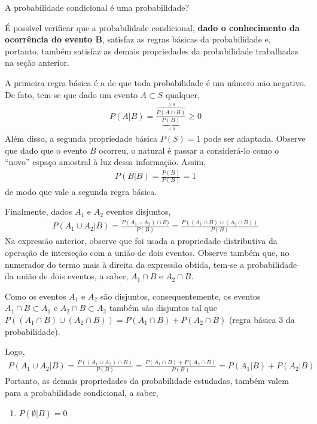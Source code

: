 \begin{example} {A probabilidade condicional é uma probabilidade?}

É possível verificar que a probabilidade condicional, \textbf{dado o conhecimento da ocorrência do evento B}, satisfaz as regras básicas da probabilidade e, portanto, também satisfaz as demais propriedades da probabilidade trabalhadas na seção anterior.

A primeira regra básica é a de que toda probabilidade é um número não negativo. De fato, tem-se que dado um evento \(A\subset S\) qualquer,
\begin{equation*}
\begin{split}P(A|B)=\frac{\overbrace{P(A\cap B)}^{\geq 0}}{\underbrace{P(B)}_{>0}}\geq 0\end{split}
\end{equation*}
Além disso, a segunda propriedade básica \(P(S)=1\) pode ser adaptada.  Observe que dado que o evento \(B\) ocorreu, o natural é passar a considerá-lo como o “novo”{} espaço amostral à luz dessa informação. Assim,
\begin{equation*}
\begin{split}P(B|B)=\frac{P(B)}{P(B)}=1\end{split}
\end{equation*}
de modo que vale a segunda regra básica.

Finalmente, dados \(A_1\) e \(A_2\)  eventos disjuntos,
\begin{equation*}
\begin{split}P(A_1\cup A_2|B)=\frac{P(A_1\cup A_2)\cap B)}{P(B)}=\frac{P((A_1\cap B)\cup(A_2\cap B))}{P(B)}\end{split}
\end{equation*}
Na expressão anterior, observe que foi usada a propriedade distributiva da operação de interseção com a união de dois eventos. Observe também que, no numerador do termo mais à direita da expressão obtida, tem-se a probabilidade da união de dois eventos, a saber, \(A_1\cap B\) e \(A_2\cap B\).

Como os eventos \(A_1\) e \(A_2\) são disjuntos, consequentemente, os eventos \(A_1\cap B\subset A_1\) e \(A_2\cap B\subset A_2\)  também são disjuntos tal que \(P((A_1\cap B)\cup(A_2\cap B))=P(A_1\cap B)+P(A_2\cap B)\) (regra básica 3 da probabilidade).

Logo,
\begin{equation*}
\begin{split}P(A_1\cup A_2|B)=\frac{P((A_1\cup A_2)\cap B)}{P(B)}=\frac{P(A_1\cap B)+P(A_2\cap B)}{P(B)}=P(A_1|B)+P(A_2|B)\end{split}
\end{equation*}
Portanto, as demais propriedades da probabilidade estudadas, também valem para a probabilidade condicional, a saber,
\begin{enumerate}
\item {} 
\(P(\emptyset |B)=0\)


\end{enumerate}
\end{example}
